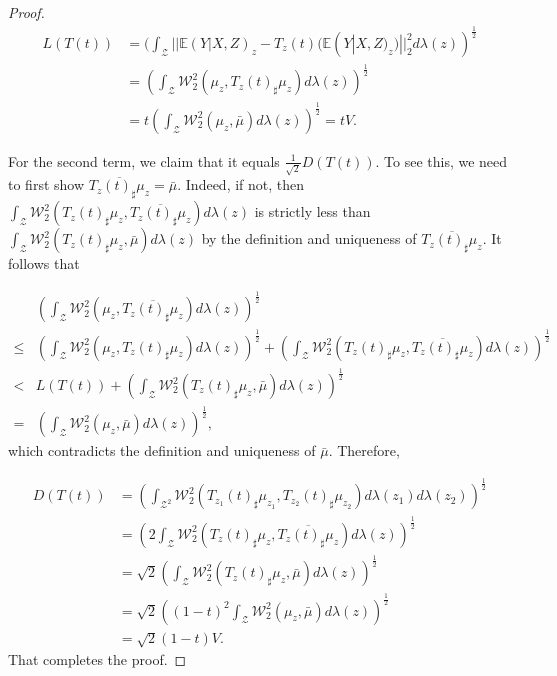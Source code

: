 \documentclass[twoside,11pt]{article}
\begin{document}
\begin{proof}
\begin{align*}
L(T(t)) & = (\int_{\mathcal{Z}} ||\mathbb{E}(Y|X,Z)_z - T_z(t)(\mathbb{E}(Y|X,Z)_z )||_2^2 d\lambda(z))^{\frac{1}{2}}\\
& = (\int_{\mathcal{Z}} \mathcal{W}_2^2(\mu_z,T_z(t)_{\sharp}\mu_z) d\lambda(z))^{\frac{1}{2}}\\
& = t(\int_{\mathcal{Z}} \mathcal{W}_2^2(\mu_z,\bar{\mu}) d\lambda(z))^{\frac{1}{2}} =  tV.
\end{align*}

For the second term, we claim that it equals $\frac{1}{\sqrt{2}} D(T(t))$. To see this, we need to first show $\overline{T_z(t)_{\sharp} \mu_z} = \bar{\mu}$. Indeed, if not, then $\int_{\mathcal{Z}} \mathcal{W}_2^2(T_z(t)_{\sharp} \mu_z,\overline{T_z(t)_{\sharp} \mu_z}) d\lambda(z)$ is strictly less than $\int_{\mathcal{Z}} \mathcal{W}_2^2(T_z(t)_{\sharp} \mu_z,\bar{\mu}) d\lambda(z)$ by the definition and uniqueness of $\overline{T_z(t)_{\sharp} \mu_z}$. It follows that

\begin{align*}
& (\int_{\mathcal{Z}} \mathcal{W}_2^2(\mu_z,\overline{T_z(t)_{\sharp} \mu_z}) d\lambda(z))^{\frac{1}{2}}\\
\leq & (\int_{\mathcal{Z}} \mathcal{W}_2^2(\mu_z,T_z(t)_{\sharp} \mu_z) d\lambda(z))^{\frac{1}{2}} + (\int_{\mathcal{Z}} \mathcal{W}_2^2(T_z(t)_{\sharp} \mu_z,\overline{T_z(t)_{\sharp} \mu_z}) d\lambda(z))^{\frac{1}{2}}\\
< & L(T(t)) + (\int_{\mathcal{Z}} \mathcal{W}_2^2(T_z(t)_{\sharp} \mu_z,\bar{\mu}) d\lambda(z))^{\frac{1}{2}}\\
= & (\int_{\mathcal{Z}} \mathcal{W}_2^2(\mu_z,\bar{\mu}) d\lambda(z))^{\frac{1}{2}},
\end{align*}
which contradicts the definition and uniqueness of $\bar{\mu}$. Therefore,

\begin{align*}
D(T(t)) & =( \int_{\mathcal{Z}^2} \mathcal{W}_2^2(T_{z_1}(t)_{\sharp}\mu_{z_1},T_{z_2}(t)_{\sharp}\mu_{z_2}) d\lambda(z_1)d\lambda(z_2))^{\frac{1}{2}}\\
& = (2\int_{\mathcal{Z}} \mathcal{W}_2^2(T_z(t)_{\sharp}\mu_z,\overline{T_z(t)_{\sharp}\mu_z}) d\lambda(z))^{\frac{1}{2}}\\
& = \sqrt{2}(\int_{\mathcal{Z}} \mathcal{W}_2^2(T_z(t)_{\sharp}\mu_z,\bar{\mu}) d\lambda(z))^{\frac{1}{2}}\\
& = \sqrt{2}((1-t)^2\int_{\mathcal{Z}} \mathcal{W}_2^2(\mu_z,\bar{\mu}) d\lambda(z))^{\frac{1}{2}}\\
& = \sqrt{2}(1-t)V.
\end{align*}
That completes the proof.
\end{proof}
\end{document}
